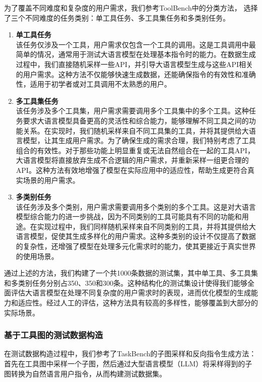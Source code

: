 为了覆盖不同难度和复杂度的用户需求，我们参考ToolBench中的分类方法，
选择了三个不同难度的任务类别：单工具任务、多工具集任务和多类别任务。

\begin{enumerate}
  \item \textbf{单工具任务} \\
    该任务仅涉及一个工具，用户需求仅包含一个工具的调用。这是工具调用中最简单的情况，通常用于测试大语言模型在处理基本指令时的能力。在数据生成过程中，我们直接随机采样一些API，并引导大语言模型生成与这些API相关的用户需求。这种方法不仅能够快速生成数据，还能确保指令的有效性和准确性，适用于初学者或对工具调用不太熟悉的用户。

  \item \textbf{多工具集任务} \\
    该任务涉及多个工具集，用户需求需要调用多个工具集中的多个工具。这种任务要求大语言模型具备更高的灵活性和综合能力，能够理解不同工具之间的功能关系。在实现时，我们随机采样来自不同工具集的工具，并将其提供给大语言模型，让其生成用户需求。为了确保生成的需求合理，我们特别考虑了工具组合的有效性。对于那些功能上明显重复或无法自然组合在一起的工具API，大语言模型将直接放弃生成不合逻辑的用户需求，并重新采样一组更合理的API。这种方法有效地增强了模型在实际应用中的适应性，帮助生成更符合真实场景的用户需求。

  \item \textbf{多类别任务} \\
    该任务涉及多个类别，用户需求需要调用多个类别的多个工具。这是对大语言模型综合能力的进一步挑战，因为不同类别的工具可能具有不同的功能和用途。在实现过程中，我们同样随机采样来自不同类别的工具，并将其提供给大语言模型，促使其生成多样化的用户需求。这种多类别的设计不仅提高了数据的复杂性，还增强了模型在处理多元化需求时的能力，使其更接近于真实世界的使用场景。

\end{enumerate}

通过上述的方法，我们构建了一个共1000条数据的测试集，其中单工具、多工具集和多类别任务分别占350、350和300条。这种结构化的测试集设计使得我们能够全面评估大语言模型在处理不同复杂度的用户需求时的表现，进而优化模型的生成能力和适应性。经过人工的评估，这种方法具有较高的多样性，能够覆盖到大部分的实际场景。

\subsubsection{基于工具图的测试数据构造}

在测试数据构造过程中，我们参考了TaskBench的子图采样和反向指令生成方法：首先在工具图中采样一个子图，然后通过大型语言模型（LLM）将采样得到的子图转换为自然语言用户指令，从而构建测试数据集。

